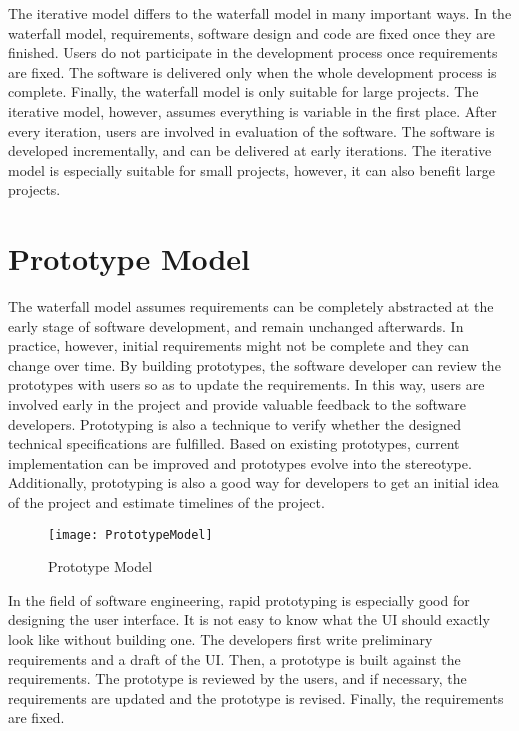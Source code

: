 The iterative model differs to the waterfall model in many important ways. In the waterfall model, requirements, software design and code are fixed once they are finished. Users do not participate in the development process once requirements are fixed. The software is delivered only when the whole development process is complete. Finally, the waterfall model is only suitable for large projects. The iterative model, however, assumes everything is variable in the first place. After every iteration, users are involved in evaluation of the software. The software is developed incrementally, and can be delivered at early iterations. The iterative model is especially suitable for small projects, however, it can also benefit large projects.

\section{Prototype Model}
The waterfall model assumes requirements can be completely abstracted at the early stage of software development, and remain unchanged afterwards. In practice, however, initial requirements might not be complete and they can change over time. By building prototypes, the software developer can review the prototypes with users so as to update the requirements. In this way, users are involved early in the project and provide valuable feedback to the software developers. Prototyping is also a technique to verify whether the designed technical specifications are fulfilled. Based on existing prototypes, current implementation can be improved and prototypes evolve into the stereotype. Additionally, prototyping is also a good way for developers to get an initial idea of the project and estimate timelines of the project.

\begin{figure}[htbp]
\centering
\texttt{[image: PrototypeModel]}
\caption{Prototype Model\label{fig:Prototype Model}}
\end{figure}

In the field of software engineering, rapid prototyping is especially good for designing the user interface. It is not easy to know what the UI should exactly look like without building one. The developers first write preliminary requirements and a draft of the UI. Then, a prototype is built against the requirements. The prototype is reviewed by the users, and if necessary, the requirements are updated and the prototype is revised. Finally, the requirements are fixed.

